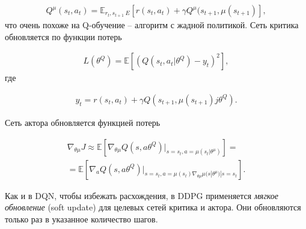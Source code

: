 \begin{equation}
    \label{eq:ch1-ddpg-1}
    \begin{multlined}
        Q^\mu (s_t, a_t) = \mathbb{E}_{r_t, s_{t+1}~E}[r(s_t, a_t) + \gamma Q^\mu(s_{t+1}, \mu(s_{t+1})],
    \end{multlined}
\end{equation}
что очень похоже на Q-обучение – алгоритм с жадной политикой. Сеть критика обновляется по функции потерь

\begin{equation}
    \label{eq:ch1-ddpg-1}
    \begin{multlined}
        L(\theta^Q) = \mathbb{E}[(Q(s_t, a_t|\theta^Q) - y_t)^2],
    \end{multlined}
\end{equation}
где

\begin{equation}
    \label{eq:ch1-ddpg-3}
    \begin{multlined}
        y_t = r(s_t, a_t) + \gamma Q(s_{t+1}, \mu(s_{t+1})j\theta^Q).
    \end{multlined}
\end{equation}

Сеть актора обновляется функцией потерь

\begin{equation}
    \label{eq:ch1-ddpg-4}
    \begin{multlined}
        \nabla_{\theta \mu} J \approx \mathbb{E}[\nabla_{\theta \mu} Q(s, a \theta^Q)|_{s=s_t,a=\mu(s_t|\theta^\mu)}] = \\
        = \mathbb{E}[\nabla_a Q(s, a \theta^Q)|_{s=s_t,a=\mu(s_t) \nabla_{\theta \mu} \mu (s|\theta^\mu)|s=s_t}].
    \end{multlined}
\end{equation}

Как и в DQN, чтобы избежать расхождения, в DDPG применяется \textit{мягкое обновление} (soft update) для целевых сетей критика и актора. Они обновляются только раз в указанное количество шагов.
